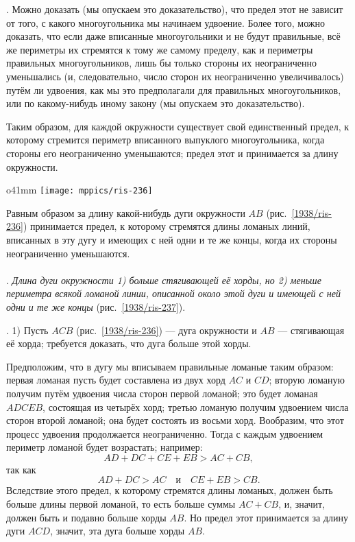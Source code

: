 \smallskip
{}.
Можно доказать (мы опускаем это доказательство), что предел этот не зависит от того, с какого многоугольника мы начинаем удвоение.
Более того, можно доказать, что если даже вписанные многоугольники и не будут правильные, всё же периметры их стремятся к тому же самому пределу, как и периметры правильных многоугольников, лишь бы только стороны их неограниченно уменьшались (и, следовательно, число сторон их неограниченно увеличивалось) путём ли удвоения, как мы это предполагали для правильных многоугольников, или по какому-нибудь иному закону (мы опускаем это доказательство).

Таким образом, для каждой окружности существует свой единственный предел, к которому стремится периметр вписанного выпуклого многоугольника, когда стороны его неограниченно уменьшаются;
предел этот и принимается за длину окружности.

{

\begin{wrapfigure}{o}{41mm}
\centering
\texttt{[image: mppics/ris-236]}
\caption{}\label{1938/ris-236}
\end{wrapfigure}

Равным образом за длину какой-нибудь дуги окружности $AB$ (рис.~\ref{1938/ris-236}) принимается предел, к которому стремятся длины ломаных линий, вписанных в эту дугу и имеющих с ней одни и те же концы, 
когда их стороны неограниченно уменьшаются.

}

\paragraph{}\label{1938/235}
.
\emph{Длина дуги окружности
1) больше стягивающей её хорды, но 2) меньше периметра всякой ломаной линии, описанной около этой дуги и имеющей с ней одни и те же концы} (рис.~\ref{1938/ris-237}).


.
1) Пусть $ACB$ (рис.~\ref{1938/ris-236}) — дуга окружности и $AB$ — стягивающая её хорда;
требуется доказать, что дуга больше этой хорды.



Предположим, что в дугу мы вписываем правильные ломаные таким образом:
первая ломаная пусть будет составлена из двух хорд $AC$ и $CD$;
вторую ломаную получим путём удвоения числа сторон первой ломаной;
это будет ломаная $ADCEB$, состоящая из четырёх хорд;
третью ломаную получим удвоением числа сторон второй ломаной;
она будет состоять из восьми хорд.
Вообразим, что этот процесс удвоения продолжается неограниченно.
Тогда с каждым удвоением периметр ломаной будет возрастать;
например:
\[AD+DC+CE+EB>AC+CB,\]
так как
\[AD+DC>AC\quad\text{и}\quad CE+EB>CB.\]
Вследствие этого предел, к которому стремятся длины ломаных, должен быть больше длины первой ломаной, то есть больше суммы $AC+CB$, и, значит, должен быть и подавно больше хорды $AB$.
Но предел этот принимается за длину дуги $ACD$, значит, эта дуга больше хорды $AB$.

